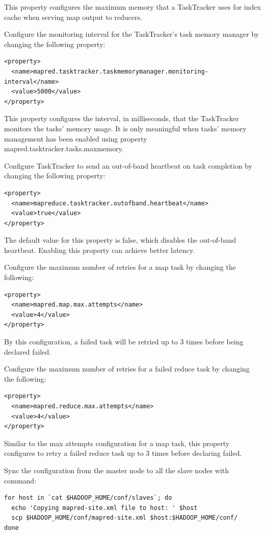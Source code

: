 This property configures the maximum memory that a TaskTracker uses for index cache when serving map output to reducers.

Configure the monitoring interval for the TaskTracker's task memory manager by changing the following property:
\lstset{style=bashstyle}
\begin{lstlisting}
<property>
  <name>mapred.tasktracker.taskmemorymanager.monitoring-interval</name>
  <value>5000</value>
</property>
\end{lstlisting}
This property configures the interval, in milliseconds, that the TaskTracker monitors the tasks' memory usage. It is only meaningful when tasks' memory management has been enabled using property mapred.tasktracker.tasks.maxmemory.

Configure TaskTracker to send an out-of-band heartbeat on task completion by changing the following property:
\lstset{style=bashstyle}
\begin{lstlisting}
<property>
  <name>mapreduce.tasktracker.outofband.heartbeat</name>
  <value>true</value>
</property>
\end{lstlisting}

The default value for this property is false, which disables the out-of-band heartbeat. Enabling this property can achieve better latency.

Configure the maximum number of retries for a map task by changing the following:
\lstset{style=bashstyle}
\begin{lstlisting}
<property>
  <name>mapred.map.max.attempts</name>
  <value>4</value>
</property>
\end{lstlisting}

By this configuration, a failed task will be retried up to 3 times before being declared failed.

Configure the maximum number of retries for a failed reduce task by changing the following:
\lstset{style=bashstyle}
\begin{lstlisting}
<property>
  <name>mapred.reduce.max.attempts</name>
  <value>4</value>
</property>
\end{lstlisting}
Similar to the max attempts configuration for a map task, this property configures to retry a failed reduce task up to 3 times before declaring failed.

Sync the configuration from the master node to all the slave nodes with command:
\lstset{style=bashstyle}
\begin{lstlisting}
for host in `cat $HADOOP_HOME/conf/slaves`; do
  echo 'Copying mapred-site.xml file to host: ' $host
  scp $HADOOP_HOME/conf/mapred-site.xml $host:$HADOOP_HOME/conf/
done
\end{lstlisting}

